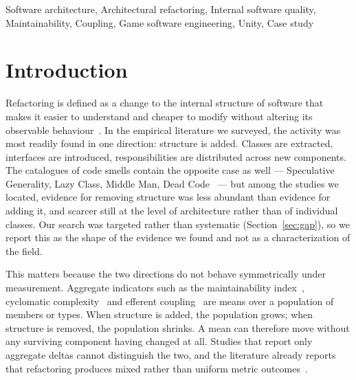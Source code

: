 \documentclass{sbc2019}%
\begin{document}
\begin{frontmatter}
\begin{abstract}
retention decisions are recorded as outcomes, a control design separating dead-code removal from architectural change, and evidence that aggregate internal quality indicators are sensitive to population composition in ways that can invert their apparent direction.
\end{abstract}

\begin{keywords}
Software architecture, Architectural refactoring, Internal software quality, Maintainability, Coupling, Game software engineering, Unity, Case study
\end{keywords}

\end{frontmatter}


\section{Introduction}

Refactoring is defined as a change to the internal structure of software that
makes it easier to understand and cheaper to modify without altering its
observable behaviour~\cite{fowler2018,mens2004}. In the empirical literature we
surveyed, the activity was most readily found in one direction: structure is
added. Classes are extracted, interfaces are introduced, responsibilities are
distributed across new components. The catalogues of code smells contain the
opposite case as well --- Speculative Generality, Lazy Class, Middle Man, Dead
Code~\cite{fowler2018} --- but among the studies we located, evidence for
removing structure was less abundant than evidence for adding it, and scarcer
still at the level of architecture rather than of individual classes. Our search
was targeted rather than systematic (Section~\ref{sec:gap}), so we report this as
the shape of the evidence we found and not as a characterization of the field.

This matters because the two directions do not behave symmetrically under
measurement. Aggregate indicators such as the maintainability index~\cite{coleman1994}, cyclomatic complexity~\cite{mccabe1976} and efferent
coupling~\cite{martin2003} are means over a population of members or types.
When structure is added, the population grows; when structure is removed, the
population shrinks. A mean can therefore move without any surviving component
having changed at all. Studies that report only aggregate deltas cannot
distinguish the two, and the literature already reports that refactoring
produces mixed rather than uniform metric outcomes~\cite{szoke2017,bavota2015,palomba2018}.
\end{document}
